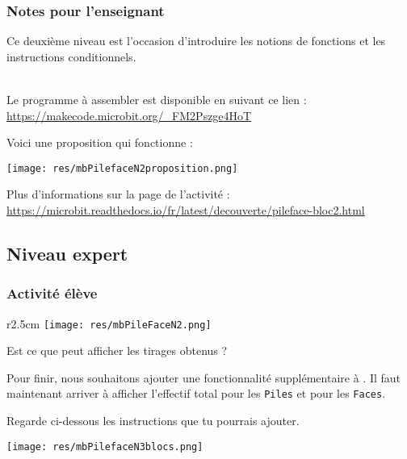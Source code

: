 \newpage
\subsubsection{Notes pour l'enseignant}

Ce deuxième niveau est l'occasion d'introduire les notions de fonctions et les instructions conditionnels.


~\\ Le programme à assembler est disponible en suivant ce lien :
~\\ \url{https://makecode.microbit.org/_FM2Pszge4HoT}

\begin{methode}
Voici une proposition qui fonctionne :

\texttt{[image: res/mbPilefaceN2proposition.png]}
\end{methode}

\begin{remarque}
Plus d'informations sur la page de l'activité :\\ \url{https://microbit.readthedocs.io/fr/latest/decouverte/pileface-bloc2.html}
\end{remarque}





%
%
\newpage
\subsection{Niveau expert}
\subsubsection{Activité élève}



\begin{wrapfigure}[4]{r}{2.5cm}
    \texttt{[image: res/mbPileFaceN2.png]}
\end{wrapfigure}
\begin{eleve}
Est ce que \mb peut afficher les tirages obtenus ?

Pour finir, nous souhaitons ajouter une fonctionnalité supplémentaire à \mb. Il faut maintenant arriver à afficher l'effectif total pour les \texttt{Piles} et pour les \texttt{Faces}.

Regarde ci-dessous les instructions que tu pourrais ajouter.

\centerline{\texttt{[image: res/mbPilefaceN3blocs.png]}}
\end{eleve}




